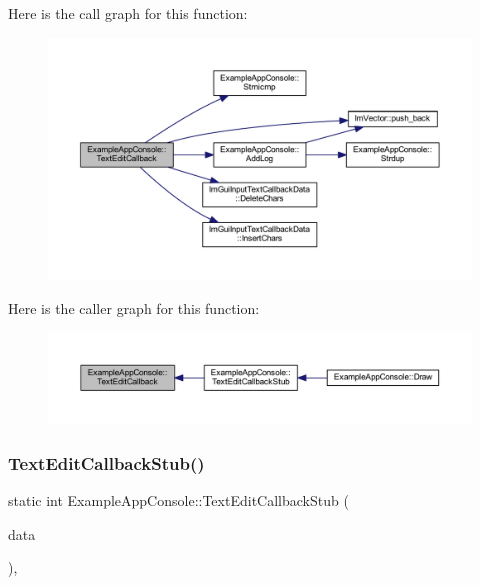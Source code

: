 Here is the call graph for this function\+:
\nopagebreak
\begin{figure}[H]
\begin{center}
\leavevmode
\includegraphics[width=350pt]{struct_example_app_console_a0bc85c5dd2bef56ae1a64697be00ec87_cgraph}
\end{center}
\end{figure}
Here is the caller graph for this function\+:
\nopagebreak
\begin{figure}[H]
\begin{center}
\leavevmode
\includegraphics[width=350pt]{struct_example_app_console_a0bc85c5dd2bef56ae1a64697be00ec87_icgraph}
\end{center}
\end{figure}
\mbox{\label{struct_example_app_console_a394debe3cbf3cfd93b9bfd2835a4fdec}} 
\subsubsection{\texorpdfstring{Text\+Edit\+Callback\+Stub()}{TextEditCallbackStub()}}
{\footnotesize\ttfamily static int Example\+App\+Console\+::\+Text\+Edit\+Callback\+Stub (\begin{DoxyParamCaption}\item[{\mbox{\hyperlink{struct_im_gui_input_text_callback_data}{Im\+Gui\+Input\+Text\+Callback\+Data}} $\ast$}]{data }\end{DoxyParamCaption})\hspace{0.3cm}{\ttfamily [inline]}, {\ttfamily [static]}}

